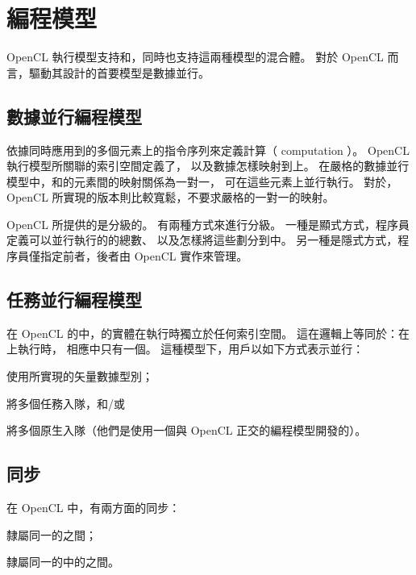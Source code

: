 \section{編程模型}
OpenCL 執行模型支持和，同時也支持這兩種模型的混合體。
對於 OpenCL 而言，驅動其設計的首要模型是數據並行。

\subsection{數據並行編程模型}

依據同時應用到的多個元素上的指令序列來定義計算（ computation ）。
OpenCL 執行模型所關聯的索引空間定義了，
以及數據怎樣映射到上。
在嚴格的數據並行模型中，和的元素間的映射關係為一對一，
可在這些元素上並行執行。
對於，OpenCL 所實現的版本則比較寬鬆，不要求嚴格的一對一的映射。

OpenCL 所提供的是分級的。
有兩種方式來進行分級。
一種是顯式方式，程序員定義可以並行執行的的總數、
以及怎樣將這些劃分到中。
另一種是隱式方式，程序員僅指定前者，後者由 OpenCL 實作來管理。

\subsection{任務並行編程模型}
在 OpenCL 的中，的實體在執行時獨立於任何索引空間。
這在邏輯上等同於：在上執行時，
相應中只有一個。
這種模型下，用戶以如下方式表示並行：
\startigBase
\item 使用所實現的矢量數據型別；
\item 將多個任務入隊，和/或
\item 將多個原生入隊（他們是使用一個與 OpenCL 正交的編程模型開發的）。
\stopigBase

\subsection{同步}
在 OpenCL 中，有兩方面的同步：
\startigBase
\item 隸屬同一的之間；
\item 隸屬同一的中的之間。
\stopigBase

